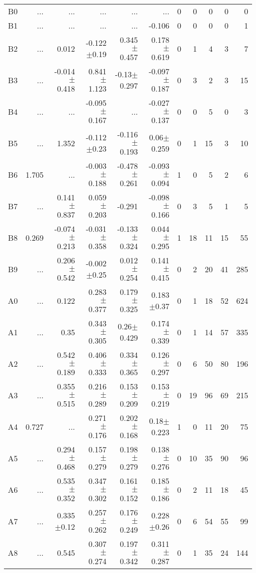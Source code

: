 \begin{table}[t]
\begin{table}[t]
\begin{center}
\begin{tabular}{c|rrrrr|rrrrr}
    B0	&	 ...	&	 ...	&	 ...	&	 ...	&	 ...	&	0	&	0	&	0	&	0	&	0	\\
    B1	&	 ...	&	 ...	&	 ...	&	 ...	&	-0.106	&	0	&	0	&	0	&	0	&	1	\\
    B2	&	 ...	&	0.012	&	-0.122$\pm$0.19	&	0.345$\pm$0.457	&	0.178$\pm$0.619	&	0	&	1	&	4	&	3	&	7	\\
    B3	&	 ...	&	-0.014$\pm$0.418	&	0.841$\pm$1.123	&	-0.13$\pm$0.297	&	-0.097$\pm$0.187	&	0	&	3	&	2	&	3	&	15	\\
    B4	&	 ...	&	 ...	&	-0.095$\pm$0.167	&	 ...	&	-0.027$\pm$0.137	&	0	&	0	&	5	&	0	&	3	\\
    B5	&	 ...	&	1.352	&	-0.112$\pm$0.23	&	-0.116$\pm$0.193	&	0.06$\pm$0.259	&	0	&	1	&	15	&	3	&	10	\\
    B6	&	1.705	&	 ...	&	-0.003$\pm$0.188	&	-0.478$\pm$0.261	&	-0.093$\pm$0.094	&	1	&	0	&	5	&	2	&	6	\\
    B7	&	 ...	&	0.141$\pm$0.837	&	0.059$\pm$0.203	&	-0.291	&	-0.098$\pm$0.166	&	0	&	3	&	5	&	1	&	5	\\
    B8	&	0.269	&	-0.074$\pm$0.213	&	-0.031$\pm$0.358	&	-0.133$\pm$0.324	&	0.044$\pm$0.295	&	1	&	18	&	11	&	15	&	55	\\
    B9	&	 ...	&	0.206$\pm$0.542	&	-0.002$\pm$0.25	&	0.012$\pm$0.254	&	0.141$\pm$0.415	&	0	&	2	&	20	&	41	&	285	\\
    A0	&	 ...	&	0.122	&	0.283$\pm$0.377	&	0.179$\pm$0.325	&	0.183$\pm$0.37	&	0	&	1	&	18	&	52	&	624	\\
    A1	&	 ...	&	0.35	&	0.343$\pm$0.305	&	0.26$\pm$0.429	&	0.174$\pm$0.339	&	0	&	1	&	14	&	57	&	335	\\
    A2	&	 ...	&	0.542$\pm$0.189	&	0.406$\pm$0.333	&	0.334$\pm$0.365	&	0.126$\pm$0.297	&	0	&	6	&	50	&	80	&	196	\\
    A3	&	 ...	&	0.355$\pm$0.515	&	0.216$\pm$0.289	&	0.153$\pm$0.209	&	0.153$\pm$0.219	&	0	&	19	&	96	&	69	&	215	\\
    A4	&	0.727	&	 ...	&	0.271$\pm$0.176	&	0.202$\pm$0.168	&	0.18$\pm$0.223	&	1	&	0	&	11	&	20	&	75	\\
    A5	&	 ...	&	0.294$\pm$0.468	&	0.157$\pm$0.279	&	0.198$\pm$0.279	&	0.138$\pm$0.276	&	0	&	10	&	35	&	90	&	96	\\
    A6	&	 ...	&	0.535$\pm$0.352	&	0.347$\pm$0.302	&	0.161$\pm$0.152	&	0.185$\pm$0.186	&	0	&	2	&	11	&	18	&	45	\\
    A7	&	 ...	&	0.335$\pm$0.12	&	0.257$\pm$0.262	&	0.176$\pm$0.249	&	0.228$\pm$0.26	&	0	&	6	&	54	&	55	&	99	\\
    A8	&	 ...	&	0.545	&	0.307$\pm$0.274	&	0.197$\pm$0.342	&	0.311$\pm$0.287	&	0	&	1	&	35	&	24	&	144	\\

\end{tabular}
\end{center}
\end{table}
\end{table}
